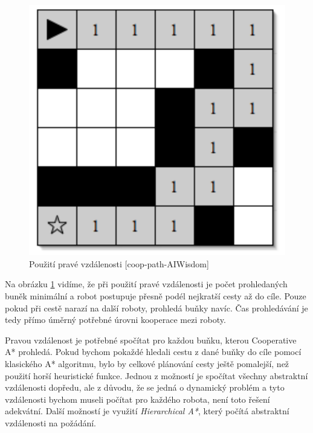 \begin{figure}[!h]
	\begin{center}
		\includegraphics*[scale=0.5]{obr/hierarchCoopMetric}
	\end{center}
	\caption[caption]{Použití pravé vzdálenosti [coop-path-AIWisdom]}
	\label{obr:hierarchCoopMetric}
\end{figure}

Na obrázku \ref{obr:hierarchCoopMetric} vidíme, že při použití pravé vzdálenosti je počet prohledaných buněk minimální a robot postupuje přesně podél nejkratší cesty až do cíle. Pouze pokud při cestě narazí na další roboty, prohledá buňky navíc. Čas prohledávání je tedy přímo úměrný potřebné úrovni kooperace mezi roboty.

Pravou vzdálenost je potřebné spočítat pro každou buňku, kterou Cooperative A* prohledá. Pokud bychom pokaždé hledali cestu z dané buňky do cíle pomocí klasického A* algoritmu, bylo by celkové plánování cesty ještě pomalejší, než použití horší heuristické funkce. Jednou z možností je spočítat všechny abstraktní vzdálenosti dopředu, ale z důvodu, že se jedná o dynamický problém a tyto vzdálenosti bychom museli počítat pro každého robota, není toto řešení adekvátní. Další možností je využití \emph{Hierarchical A*}, který počítá abstraktní vzdálenosti na požádání.

